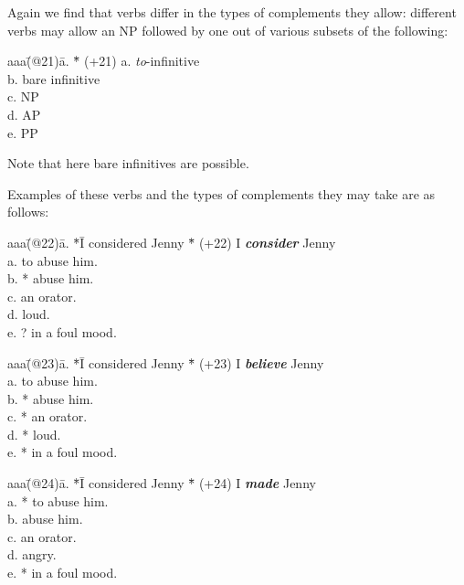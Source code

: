 Again we find that verbs differ in the types of complements they allow:
different verbs may allow an NP followed by one out of various subsets
of the following:
\begin{tabbing}
aaa\=(@21)\= a. \= *\= \kill
   \>(+21)\> a. \>  \> {\em to\/}-infinitive      \\
   \>  \>    b. \>  \> bare infinitive   \\
   \>  \>    c. \>  \> NP   \\
   \>  \>    d. \>  \> AP   \\
   \>  \>    e. \>  \> PP  
\end{tabbing}
Note that here bare infinitives are possible.

Examples of these verbs and the types of complements they may take are
as follows:
\begin{tabbing}
aaa\=(@22)\= a. \= *\= I considered Jenny \= *\=        \kill
   \>(+22)\>    \>  \> I {\em \bf consider} Jenny               \\
   \>     \> a. \>  \>                  \>  \> to abuse him. \\
   \>     \> b. \>  \>                  \> *\> abuse him. \\
   \>     \> c. \>  \>                  \>  \> an orator.    \\    
   \>     \> d. \>  \>                  \>  \> loud.    \\    
   \>     \> e. \>  \>                  \> ?\> in a foul mood.
\end{tabbing}
\begin{tabbing}
aaa\=(@23)\= a. \= *\= I considered Jenny \= *\=        \kill
   \>(+23)\>    \>  \> I {\em \bf believe} Jenny               \\
   \>     \> a. \>  \>                  \>  \> to abuse him. \\
   \>     \> b. \>  \>                  \> *\> abuse him. \\
   \>     \> c. \>  \>                  \> *\> an orator.    \\    
   \>     \> d. \>  \>                  \> *\> loud.    \\    
   \>     \> e. \>  \>                  \> *\> in a foul mood.
\end{tabbing}
\begin{tabbing}
aaa\=(@24)\= a. \= *\= I considered Jenny \= *\=        \kill
   \>(+24)\>    \>  \> I {\em \bf made} Jenny               \\
   \>     \> a. \>  \>                  \> *\> to abuse him. \\
   \>     \> b. \>  \>                  \>  \> abuse him. \\
   \>     \> c. \>  \>                  \>  \> an orator.    \\    
   \>     \> d. \>  \>                  \>  \> angry.    \\    
   \>     \> e. \>  \>                  \> *\> in a foul mood.
\end{tabbing}
